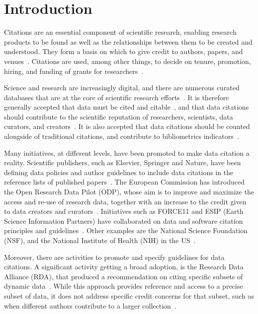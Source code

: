 \section{Introduction}

Citations are an essential component of scientific research, enabling research products to be found as well as the relationships between them to be created and understood. 
They form a basis on which to give credit to authors, papers, and venues~\citep{ZouP16, cousijn2019bringing, cronin1984}.
Citations are used, among other things, to decide on tenure, promotion, hiring, and funding of grants for researchers~\citep{meho2007impact, Cronin01, Hartley17, Kosten16}.

Science and research are increasingly digital, and there are numerous curated databases that are at the core of scientific research efforts~\citep{bunemann2016citation}.
It is therefore generally accepted that data must be cited and citable~\citep{LawrenceEtAl2011,CallaghanDPTCKABBLLMHSWW12}, and that data citations should contribute to the scientific reputation of researchers, scientists, data curators, and creators~\citep{AltmanEtAl2015,Spengler2012}.
It is also accepted that data citations should be counted alongside of traditional citations, and contribute to bibliometrics indicators~\citep{Belter2014,Peters2016}.

\textcolor{correction}{Many initiatives, at different levels, have been promoted to make data citation a reality. 
Scientific publishers, such as Elsevier, Springer and Nature, have been defining data policies and author guidelines to include data citations in the reference lists of published papers~\cite{cousijn2019bringing}. 
The European Commission has introduced the Open Research Data Pilot (ODP), whose aim is to improve and maximize the access and re-use of research data, together with an increase to the credit given to data creators and curators~\cite{Silvello18jasist}. Initiatives such as FORCE11 and ESIP (Earth Science Information Partners) have collaborated on data and software citation principles and guidelines~\cite{esip2019}. Other examples are the National Science Foundation (NSF), and the National Institute of Health (NIH) in the US~\cite{Silvello18jasist}.}

\textcolor{correction}{Moreover, there are  activities to  promote and specify guidelines for data citations. A significant activity getting a broad adoption, is the Research Data Alliance (RDA), that produced a recommendation on citing specific subsets of dynamic data~\cite{rauber2015data}.%
While this approach provides reference and access to a precise subset of data, it does  not address specific credit concerns for that subset, such as when different authors contribute to a larger collection~\cite{parsons2019history}.} 

